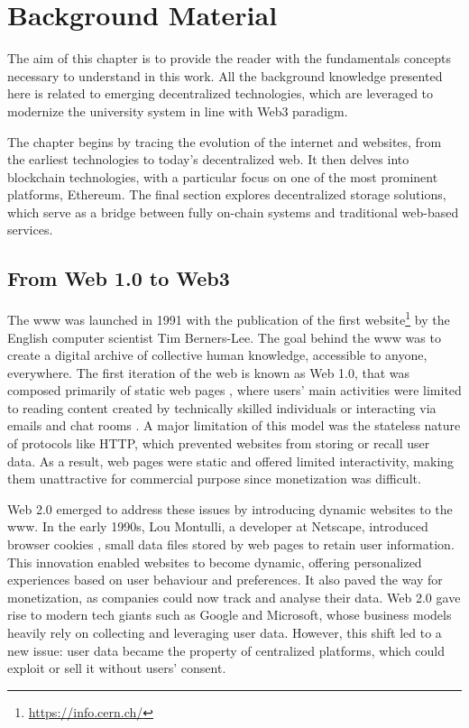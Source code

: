 \chapter{Background Material}
\label{chap:background}
The aim of this chapter is to provide the reader with the fundamentals concepts necessary to understand in this work. All the background knowledge presented here is related to emerging decentralized technologies, which are leveraged to modernize the university system in line with Web3 paradigm.

The chapter begins by tracing the evolution of the internet and websites, from the earliest technologies to today's decentralized web. It then delves into blockchain technologies, with a particular focus on one of the most prominent platforms, Ethereum. The final section explores decentralized storage solutions, which serve as a bridge between fully on-chain systems and traditional web-based services.

\section{From Web 1.0 to Web3}
\label{sec:web3}
The \gls{www} \cite{berners1992world} was launched in 1991 with the publication of the first website\footnote{\url{https://info.cern.ch/}} by the English computer scientist Tim Berners-Lee. The goal behind the \acrshort{www} was to create a digital archive of collective human knowledge, accessible to anyone, everywhere. The first iteration of the web is known as Web 1.0, that was composed primarily of static web pages \cite{choudhury2014world}, where users' main activities were limited to reading content created by technically skilled individuals or interacting via emails and chat rooms \cite{murray2023promise}. A major limitation of this model was the stateless nature of protocols like HTTP, which prevented websites from storing or recall user data. As a result, web pages were static and offered limited interactivity, making them unattractive for commercial purpose since monetization was difficult.

Web 2.0 emerged to address these issues by introducing dynamic websites to the \gls{www}. In the early 1990s, Lou Montulli, a developer at Netscape, introduced browser cookies \cite{kristol1997rfc2109}, small data files stored by web pages to retain user information. This innovation enabled websites to become dynamic, offering personalized experiences based on user behaviour and preferences. It also paved the way for monetization, as companies could now track and analyse their data. Web 2.0 gave rise to modern tech giants such as Google and Microsoft, whose business models heavily rely on collecting and leveraging user data. However, this shift led to a new issue: user data became the property of centralized platforms, which could exploit or sell it without users' consent.

